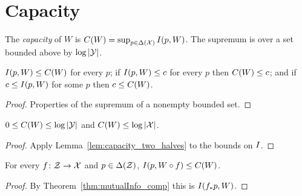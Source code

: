 \chapter{Capacity}
\label{chap:capacity}

\begin{definition}[Capacity]
  \label{def:capacity}
  \leanok
  The \emph{capacity} of $W$ is $C(W) = \sup_{p \in \Delta(\mathcal X)} I(p, W)$.  The supremum is over a
  set bounded above by $\log|\mathcal Y|$.
\end{definition}

\begin{lemma}
  \label{lem:capacity_two_halves}
  \leanok
  $I(p, W) \le C(W)$ for every $p$; if $I(p, W) \le c$ for every $p$ then $C(W) \le c$; and
  if $c \le I(p, W)$ for some $p$ then $c \le C(W)$.
\end{lemma}
\begin{proof}
  \leanok
  Properties of the supremum of a nonempty bounded set.
\end{proof}

\begin{theorem}
  \label{thm:capacity_bounds}
  \leanok
  $0 \le C(W) \le \log|\mathcal Y|$ and $C(W) \le \log|\mathcal X|$.
\end{theorem}
\begin{proof}
  \leanok
  Apply Lemma~\ref{lem:capacity_two_halves} to the bounds on $I$.
\end{proof}

\begin{lemma}
  \label{lem:mutualInfo_comp_le_capacity}
  \leanok
  For every $f \colon \mathcal Z \to \mathcal X$ and $p \in \Delta(\mathcal Z)$, $I(p, W \circ f) \le C(W)$.
\end{lemma}
\begin{proof}
  \leanok
  By Theorem~\ref{thm:mutualInfo_comp} this is $I(f_* p, W)$.
\end{proof}

